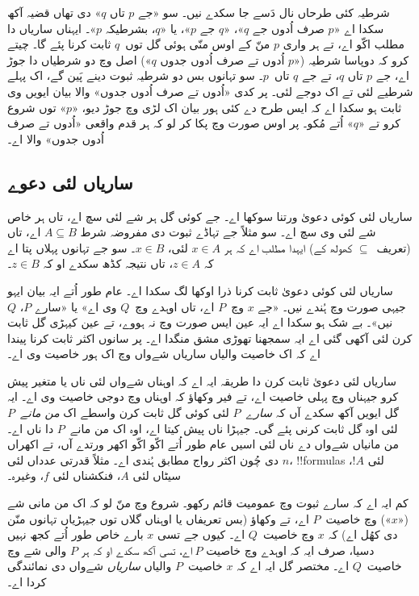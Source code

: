 \documentclass[../../../include/open-logic-section]{subfiles}
\begin{document}
شرطیہ کئی طرحاں نال دَسے جا سکدے نیں۔ سو «جے $p$ تاں $q$» دی تھاں قضیہ آکھ سکدا اے «$p$ صرف اُدوں جے $q$»، «$q$ جے $p$»، یا «$q$، بشرطیکہ $p$»۔ ایہناں ساریاں دا مطلب اکّو اے، تے ہر واری $p$ منّ کے اوس منّی ہوئی گل توں~$q$ ثابت کرنا پئے گا۔ چیتے کرو کہ دوپاسا شرطیہ («$p$ اُدوں تے صرف اُدوں جدوں $q$») اصل وچ دو شرطیاں دا جوڑ اے، جے $p$ تاں $q$، تے جے $q$ تاں~$p$۔ سو تہانوں بس دو شرطیہ ثبوت دینے پَین گے، اک پہلے شرطیے لئی تے اک دوجے لئی۔ پر کدی «اُدوں تے صرف اُدوں جدوں» والا بیان ایویں وی ثابت ہو سکدا اے کہ ایس طرح دے کئی ہور بیان اک لڑی وچ جوڑ دیو، «$p$» توں شروع کرو تے «$q$» اُتے مُکو۔ پر اوس صورت وچ پکا کر لو کہ ہر قدم واقعی «اُدوں تے صرف اُدوں جدوں» والا اے۔

\subsection{ساریاں لئی دعوے}

ساریاں لئی کوئی دعویٰ ورتنا سوکھا اے۔ جے کوئی گل ہر شے لئی سچ اے، تاں ہر خاص شے لئی وی سچ اے۔ سو مثلاً جے تہاڈے ثبوت دی مفروضہ شرط $A \subseteq B$ اے، تاں (تعریف~$\subseteq$ کھولھ کے) ایہدا مطلب اے کہ ہر $x \in A$ لئی، $x \in B$۔ سو جے تہانوں پہلاں پتا اے کہ $z \in A$، تاں نتیجہ کڈھ سکدے او کہ $z \in B$۔

ساریاں لئی کوئی دعویٰ ثابت کرنا ذرا اوکھا لگ سکدا اے۔ عام طور اُتے ایہ بیان ایہو جیہی صورت وچ ہُندے نیں۔ «جے $x$ وچ~$P$ اے، تاں اوہدے وچ~$Q$ وی اے» یا «سارے $P$، $Q$ نیں»۔ بے شک ہو سکدا اے ایہ عین ایس صورت وچ نہ ہووے، تے عین کیہڑی گل ثابت کرن لئی آکھی گئی اے ایہ سمجھنا تھوڑی مشق منگدا اے۔ پر سانوں اکثر ثابت کرنا پیندا اے کہ اک خاصیت والیاں ساریاں شےواں وچ اک ہور خاصیت وی اے۔

ساریاں لئی دعویٰ ثابت کرن دا طریقہ ایہ اے کہ اوہناں شےواں لئی ناں یا متغیر پیش کرو جیہناں وچ پہلی خاصیت اے، تے فیر وکھاؤ کہ اوہناں وچ دوجی خاصیت وی اے۔ ایہ گل ایویں آکھ سکدے آں کہ \emph{سارے}~$P$ لئی کوئی گل ثابت کرن واسطے اک \emph{من مانے}~$P$ لئی اوہ گل ثابت کرنی پئے گی۔ جیہڑا ناں پیش کیتا اے، اوہ اک من مانے~$P$ دا ناں اے۔ من مانیاں شےواں دے ناں لئی اسیں عام طور اُتے اکّو اکّو اکھر ورتدے آں، تے اکھراں دی چُون اکثر رواج مطابق ہُندی اے۔ مثلاً قدرتی عدداں لئی $n$، !!{formula}s لئی $!A$، سیٹاں لئی $A$، فنکشناں لئی $f$، وغیرہ۔

کم ایہ اے کہ سارے ثبوت وچ عمومیت قائم رکھو۔ شروع وچ منّ لو کہ اک من مانی شے («$x$») وچ خاصیت~$P$ اے، تے وکھاؤ (بس تعریفاں یا اوہناں گلاں توں جیہڑیاں تہانوں منّن دی کھُل اے) کہ $x$ وچ خاصیت~$Q$ اے۔ کیوں جے تسی $x$ بارے خاص طور اُتے کجھ نہیں دسیا، صرف ایہ کہ اوہدے وچ خاصیت $P$ اے، تسی آکھ سکدے او کہ ہر $P$ والی شے وچ خاصیت~$Q$ اے۔ مختصر گل ایہ اے کہ $x$ خاصیت~$P$ والیاں \emph{ساریاں} شےواں دی نمائندگی کردا اے۔
\end{document}
